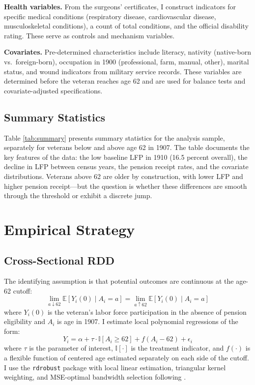 \documentclass[12pt]{article}
\newcommand{\E}{\mathbb{E}}
\newcommand{\ind}{\mathbb{I}}
\begin{document}
\textbf{Health variables.} From the surgeons' certificates, I construct indicators for specific medical conditions (respiratory disease, cardiovascular disease, musculoskeletal conditions), a count of total conditions, and the official disability rating. These serve as controls and mechanism variables.

\textbf{Covariates.} Pre-determined characteristics include literacy, nativity (native-born vs.\ foreign-born), occupation in 1900 (professional, farm, manual, other), marital status, and wound indicators from military service records. These variables are determined before the veteran reaches age 62 and are used for balance tests and covariate-adjusted specifications.

\subsection{Summary Statistics}



Table \ref{tab:summary} presents summary statistics for the analysis sample, separately for veterans below and above age 62 in 1907. The table documents the key features of the data: the low baseline LFP in 1910 (16.5 percent overall), the decline in LFP between census years, the pension receipt rates, and the covariate distributions. Veterans above 62 are older by construction, with lower LFP and higher pension receipt---but the question is whether these differences are smooth through the threshold or exhibit a discrete jump.


\section{Empirical Strategy}

\subsection{Cross-Sectional RDD}

The identifying assumption is that potential outcomes are continuous at the age-62 cutoff:
\begin{equation}
\lim_{a \downarrow 62} \E[Y_i(0) \mid A_i = a] = \lim_{a \uparrow 62} \E[Y_i(0) \mid A_i = a]
\end{equation}
where $Y_i(0)$ is the veteran's labor force participation in the absence of pension eligibility and $A_i$ is age in 1907. I estimate local polynomial regressions of the form:
\begin{equation}
Y_i = \alpha + \tau \cdot \ind[A_i \geq 62] + f(A_i - 62) + \epsilon_i
\end{equation}
where $\tau$ is the parameter of interest, $\ind[\cdot]$ is the treatment indicator, and $f(\cdot)$ is a flexible function of centered age estimated separately on each side of the cutoff. I use the \texttt{rdrobust} package \citep{calonico2014robust} with local linear estimation, triangular kernel weighting, and MSE-optimal bandwidth selection following \citet{imbens2012optimal}.
\end{document}
